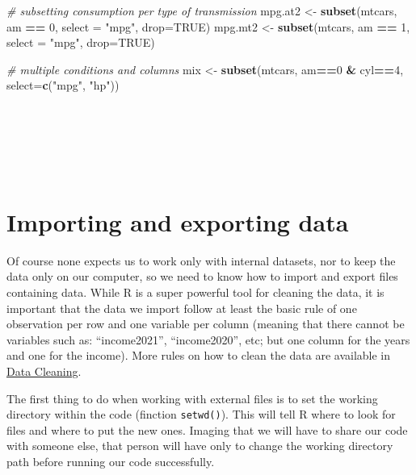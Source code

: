 \documentclass[
]{svmono}
\newenvironment{Shaded}{\begin{snugshade}}{\end{snugshade}}
\newcommand{\AttributeTok}[1]{\textcolor[rgb]{0.13,0.29,0.53}{#1}}
\newcommand{\CommentTok}[1]{\textcolor[rgb]{0.56,0.35,0.01}{\textit{#1}}}
\newcommand{\ConstantTok}[1]{\textcolor[rgb]{0.56,0.35,0.01}{#1}}
\newcommand{\DecValTok}[1]{\textcolor[rgb]{0.00,0.00,0.81}{#1}}
\newcommand{\FunctionTok}[1]{\textcolor[rgb]{0.13,0.29,0.53}{\textbf{#1}}}
\newcommand{\NormalTok}[1]{#1}
\newcommand{\OtherTok}[1]{\textcolor[rgb]{0.56,0.35,0.01}{#1}}
\newcommand{\SpecialCharTok}[1]{\textcolor[rgb]{0.81,0.36,0.00}{\textbf{#1}}}
\newcommand{\StringTok}[1]{\textcolor[rgb]{0.31,0.60,0.02}{#1}}
\begin{document}
\begin{Shaded}
\begin{Highlighting}[]
\CommentTok{\# subsetting consumption per type of transmission}
\NormalTok{mpg.at2 }\OtherTok{\textless{}{-}} \FunctionTok{subset}\NormalTok{(mtcars, am }\SpecialCharTok{==} \DecValTok{0}\NormalTok{, }\AttributeTok{select =} \StringTok{"mpg"}\NormalTok{, }\AttributeTok{drop=}\ConstantTok{TRUE}\NormalTok{)}
\NormalTok{mpg.mt2 }\OtherTok{\textless{}{-}} \FunctionTok{subset}\NormalTok{(mtcars, am }\SpecialCharTok{==} \DecValTok{1}\NormalTok{, }\AttributeTok{select =} \StringTok{"mpg"}\NormalTok{, }\AttributeTok{drop=}\ConstantTok{TRUE}\NormalTok{)}

\CommentTok{\# multiple conditions and columns}
\NormalTok{mix }\OtherTok{\textless{}{-}} \FunctionTok{subset}\NormalTok{(mtcars, am}\SpecialCharTok{==}\DecValTok{0} \SpecialCharTok{\&}\NormalTok{ cyl}\SpecialCharTok{==}\DecValTok{4}\NormalTok{, }\AttributeTok{select=}\FunctionTok{c}\NormalTok{(}\StringTok{"mpg"}\NormalTok{, }\StringTok{"hp"}\NormalTok{))}
\end{Highlighting}
\end{Shaded}

~

~

~

\hypertarget{importing-and-exporting-data}{%
\section{Importing and exporting data}\label{importing-and-exporting-data}}

Of course none expects us to work only with internal datasets, nor to
keep the data only on our computer, so we need to know how to import and
export files containing data. While R is a super powerful tool for
cleaning the data, it is important that the data we import follow at
least the basic rule of one observation per row and one variable per
column (meaning that there cannot be variables such as: ``income2021'',
``income2020'', etc; but one column for the years and one for the income).
More rules on how to clean the data are available in \protect\hyperlink{data-cleaning}{Data Cleaning}.

The first thing to do when working with external files is to set the
working directory within the code (finction \texttt{setwd()}). This will tell R
where to look for files and where to put the new ones. Imaging that we
will have to share our code with someone else, that person will have
only to change the working directory path before running our code
successfully.
\end{document}
